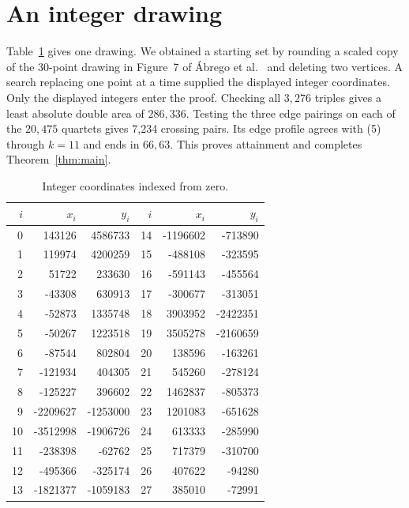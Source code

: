 \documentclass[11pt]{article}
\begin{document}
\section{An integer drawing}
Table~\ref{tab:coords} gives one drawing. We obtained a starting set by rounding a scaled copy of the 30-point drawing in Figure~7 of Ábrego et al.~\cite{abregoupper} and deleting two vertices. A search replacing one point at a time supplied the displayed integer coordinates. Only the displayed integers enter the proof. Checking all \(3,276\) triples gives a least absolute double area of \(286,336\). Testing the three edge pairings on each of the \(20,475\) quartets gives 7,234 crossing pairs. Its edge profile agrees with (5) through \(k=11\) and ends in \(66,63\). This proves attainment and completes Theorem~\ref{thm:main}.
\begin{table}[ht]
\centering\small
\begin{tabular}{rrr@{\qquad}rrr}
\toprule \(i\)&\(x_i\)&\(y_i\)&\(i\)&\(x_i\)&\(y_i\)\\\midrule
0 & 143126 & 4586733 & 14 & -1196602 & -713890 \\
1 & 119974 & 4200259 & 15 & -488108 & -323595 \\
2 & 51722 & 233630 & 16 & -591143 & -455564 \\
3 & -43308 & 630913 & 17 & -300677 & -313051 \\
4 & -52873 & 1335748 & 18 & 3903952 & -2422351 \\
5 & -50267 & 1223518 & 19 & 3505278 & -2160659 \\
6 & -87544 & 802804 & 20 & 138596 & -163261 \\
7 & -121934 & 404305 & 21 & 545260 & -278124 \\
8 & -125227 & 396602 & 22 & 1462837 & -805373 \\
9 & -2209627 & -1253000 & 23 & 1201083 & -651628 \\
10 & -3512998 & -1906726 & 24 & 613333 & -285990 \\
11 & -238398 & -62762 & 25 & 717379 & -310700 \\
12 & -495366 & -325174 & 26 & 407622 & -94280 \\
13 & -1821377 & -1059183 & 27 & 385010 & -72991 \\
\bottomrule
\end{tabular}
\caption{Integer coordinates indexed from zero.}\label{tab:coords}
\end{table}
\end{document}
